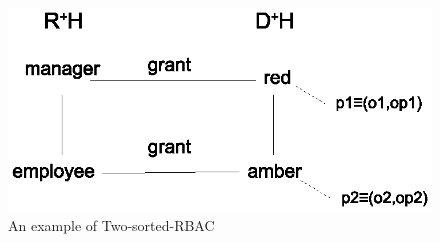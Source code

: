 \begin{figure}
 	\centering
 	\includegraphics[width=.7\textwidth]{ABAC16/two-sorted-rbac-example}
 	\caption{An example of Two-sorted-RBAC}
 	\label{fig:two-sorted-rbac-example}
 \end{figure} 
